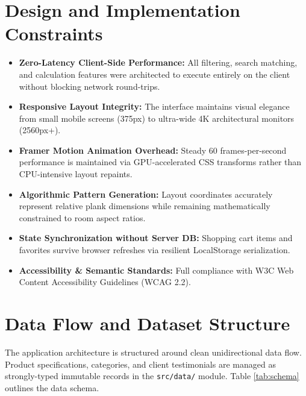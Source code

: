 \documentclass[12pt,a4paper]{report}
\begin{document}
\section{Design and Implementation Constraints}
\begin{itemize}
    \item \textbf{Zero-Latency Client-Side Performance:} All filtering, search matching, and calculation features were architected to execute entirely on the client without blocking network round-trips.
    \item \textbf{Responsive Layout Integrity:} The interface maintains visual elegance from small mobile screens (375px) to ultra-wide 4K architectural monitors (2560px+).
    \item \textbf{Framer Motion Animation Overhead:} Steady 60 frames-per-second performance is maintained via GPU-accelerated CSS transforms rather than CPU-intensive layout repaints.
    \item \textbf{Algorithmic Pattern Generation:} Layout coordinates accurately represent relative plank dimensions while remaining mathematically constrained to room aspect ratios.
    \item \textbf{State Synchronization without Server DB:} Shopping cart items and favorites survive browser refreshes via resilient LocalStorage serialization.
    \item \textbf{Accessibility \& Semantic Standards:} Full compliance with W3C Web Content Accessibility Guidelines (WCAG 2.2).
\end{itemize}

\section{Data Flow and Dataset Structure}
The application architecture is structured around clean unidirectional data flow. Product specifications, categories, and client testimonials are managed as strongly-typed immutable records in the \texttt{src/data/} module. Table \ref{tab:schema} outlines the data schema.
\end{document}
